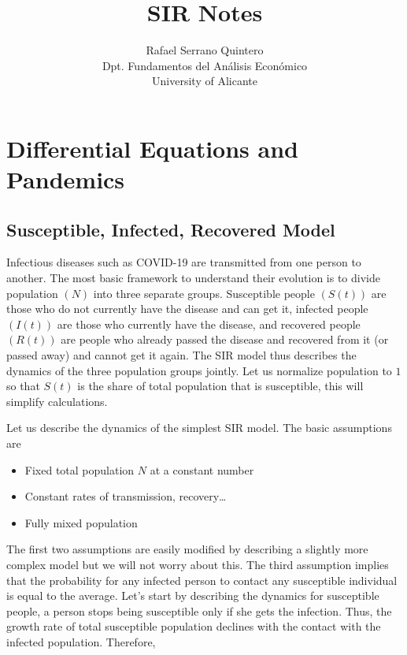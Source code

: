 \documentclass[a4paper,11pt]{article}
\title{SIR Notes}
\author{Rafael Serrano Quintero \\
Dpt. Fundamentos del An\'alisis Econ\'omico \\
University of Alicante}
\date{}
\theoremstyle{definition}
\theoremstyle{plain}
\begin{document}
      

\maketitle

\section{Differential Equations and Pandemics}\label{differential-equations-and-pandemics}

\subsection{Susceptible, Infected, Recovered Model}\label{susceptible-infected-recovered-model}

Infectious diseases such as COVID-19 are transmitted from one person to another. The most basic framework to understand their evolution is to divide population \((N)\) into three separate groups. Susceptible people \((S(t))\) are those who do not currently have the disease and can get it, infected people \((I(t))\) are those who currently have the disease, and recovered people \((R(t))\) are people who already passed the disease and recovered from it (or passed away) and cannot get it again. The SIR model thus describes the dynamics of the three population groups jointly. Let us normalize population to \(1\) so that \(S(t)\) is the share of total population that is susceptible, this will simplify calculations.

Let us describe the dynamics of the simplest SIR model. The basic assumptions are

\begin{itemize}
	\item Fixed total population \(N\) at a constant number
	\item Constant rates of transmission, recovery\ldots{}
	\item Fully mixed population
\end{itemize}

The first two assumptions are easily modified by describing a slightly more complex model but we will not worry about this. The third assumption implies that the probability for any infected person to contact any susceptible individual is equal to the average.  Let's start by describing the dynamics for susceptible people, a person stops being susceptible only if she gets the infection. Thus, the growth rate of total susceptible population declines with the contact with the infected population. Therefore,
\end{document}
